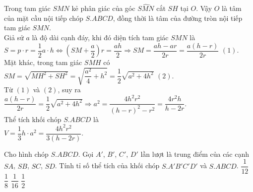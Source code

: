 \begin{ex}
{	Trong tam giác $SMN$ kẻ phân giác của góc $\widehat{SMN}$ cắt $SH$ tại $O$. Vậy $O$ là tâm của mặt cầu nội tiếp chóp $S.ABCD$, đồng thời là tâm của đường tròn nội tiếp tam giác $SMN$.\\
	Giả sử $a$ là độ dài cạnh đáy, khi đó diện tích tam giác $SMN$ là\\
	$S=p\cdot r=\dfrac{1}{2}a\cdot h\Leftrightarrow \left(SM+\dfrac{a}{2}\right)r=\dfrac{ah}{2}\Rightarrow SM=\dfrac{ah-ar}{2r}=\dfrac{a(h-r)}{2r}$ $(1)$.\\
	Mặt khác, trong tam giác $SMH$ có $SM=\sqrt{MH^2+SH^2}=\sqrt{\dfrac{a^2}{4}+h^2}=\dfrac{1}{2}\sqrt{a^2+4h^2}$ $(2)$.\\
	Từ $(1)$ và $(2)$, suy ra $\dfrac{a(h-r)}{2r}=\dfrac{1}{2}\sqrt{a^2+4h^2}\Rightarrow a^2=\dfrac{4h^2r^2}{(h-r)^2-r^2}=\dfrac{4r^2h}{h-2r}$.\\
	Thể tích khối chóp $S.ABCD$ là\\
	$V=\dfrac{1}{3}h\cdot a^2=\dfrac{4h^2r^2}{3(h-2r)}$.
		
	}
\end{ex}

\begin{ex}%
	Cho hình chóp $S.ABCD$. Gọi $A'$, $B'$, $C'$, $D'$ lần lượt là trung điểm của các cạnh $SA$, $SB$, $SC$, $SD$. Tính tỉ số thể tích của khối chóp $S.A'B'C'D'$ và $S.ABCD$.
	\choice
	{$\dfrac{1}{12}$}
	{\True $\dfrac{1}{8}$}
	{$\dfrac{1}{16}$}
	{$\dfrac{1}{2}$}
\end{ex}

